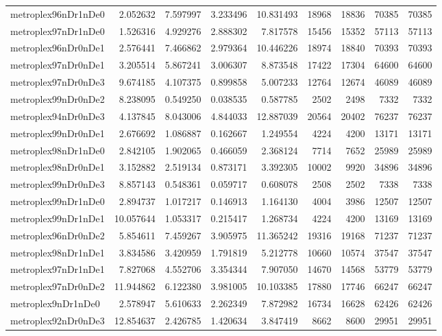 \begin{longtable}{|l|r|r|r|r|r|r|r|r|}
metroplex96nDr1nDe0 & 2.052632 & 7.597997 & 3.233496 & 10.831493 & 18968 & 18836 & 70385 & 70385 \\
metroplex97nDr1nDe0 & 1.526316 & 4.929276 & 2.888302 & 7.817578 & 15456 & 15352 & 57113 & 57113 \\
metroplex96nDr0nDe1 & 2.576441 & 7.466862 & 2.979364 & 10.446226 & 18974 & 18840 & 70393 & 70393 \\
metroplex97nDr0nDe1 & 3.205514 & 5.867241 & 3.006307 & 8.873548 & 17422 & 17304 & 64600 & 64600 \\
metroplex97nDr0nDe3 & 9.674185 & 4.107375 & 0.899858 & 5.007233 & 12764 & 12674 & 46089 & 46089 \\
metroplex99nDr0nDe2 & 8.238095 & 0.549250 & 0.038535 & 0.587785 & 2502 & 2498 & 7332 & 7332 \\
metroplex94nDr0nDe3 & 4.137845 & 8.043006 & 4.844033 & 12.887039 & 20564 & 20402 & 76237 & 76237 \\
metroplex99nDr0nDe1 & 2.676692 & 1.086887 & 0.162667 & 1.249554 & 4224 & 4200 & 13171 & 13171 \\
metroplex98nDr1nDe0 & 2.842105 & 1.902065 & 0.466059 & 2.368124 & 7714 & 7652 & 25989 & 25989 \\
metroplex98nDr0nDe1 & 3.152882 & 2.519134 & 0.873171 & 3.392305 & 10002 & 9920 & 34896 & 34896 \\
metroplex99nDr0nDe3 & 8.857143 & 0.548361 & 0.059717 & 0.608078 & 2508 & 2502 & 7338 & 7338 \\
metroplex99nDr1nDe0 & 2.894737 & 1.017217 & 0.146913 & 1.164130 & 4004 & 3986 & 12507 & 12507 \\
metroplex99nDr1nDe1 & 10.057644 & 1.053317 & 0.215417 & 1.268734 & 4224 & 4200 & 13169 & 13169 \\
metroplex96nDr0nDe2 & 5.854611 & 7.459267 & 3.905975 & 11.365242 & 19316 & 19168 & 71237 & 71237 \\
metroplex98nDr1nDe1 & 3.834586 & 3.420959 & 1.791819 & 5.212778 & 10660 & 10574 & 37547 & 37547 \\
metroplex97nDr1nDe1 & 7.827068 & 4.552706 & 3.354344 & 7.907050 & 14670 & 14568 & 53779 & 53779 \\
metroplex97nDr0nDe2 & 11.944862 & 6.122380 & 3.981005 & 10.103385 & 17880 & 17746 & 66247 & 66247 \\
metroplex9nDr1nDe0 & 2.578947 & 5.610633 & 2.262349 & 7.872982 & 16734 & 16628 & 62426 & 62426 \\
metroplex92nDr0nDe3 & 12.854637 & 2.426785 & 1.420634 & 3.847419 & 8662 & 8600 & 29951 & 29951 \\

\end{longtable}
